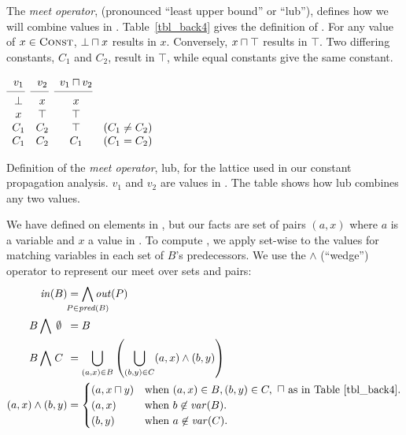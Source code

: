 \documentclass[12pt]{report}
\begin{document}
The \emph{meet operator}, \lub (pronounced ``least upper bound'' or
``lub''), defines how we will combine values in
\setLC. Table~\ref{tbl_back4} gives the definition of \lub. For any
value of $x \in \textsc{Const}$, $\bot \lub x$ results in $x$. Conversely, $x
\lub \top$ results in $\top$. Two differing constants, $C_1$ and
$C_2$, result in $\top$, while equal constants give the same constant. 

\begin{myfig}
  \begin{math}
    \begin{array}{cccc}
      v_1 & v_2 & v_1 \lub v_2 \\
      \cmidrule(r){1-1}\cmidrule(r){2-2}\cmidrule(r){3-3}
      \bot & x & x \\
      x & \top & \top & \\ 
      C_1 & C_2 & \top & \text{($C_1 \neq C_2$)} \\
      C_1 & C_2 & C_1 & \text{($C_1 = C_2$)}
    \end{array}
  \end{math}
  \caption{Definition of the \emph{meet operator}, lub, for the
    lattice used in our constant propagation analysis. $v_1$ and $v_2$
    are values in \setLC. The table shows how lub combines any two
    values.}
  \label{tbl_back4}
\end{myfig}

We have defined \lub on elements in \setLC, but our facts are set of
pairs $(a,x)$ where $a$ is a variable and $x$ a value in \setLC. To
compute \inBa, we apply \lub set-wise to the values for matching
variables in each \out set of $B$'s predecessors. We use the $\wedge$
(``wedge'') operator to represent our meet over sets and pairs:
\begin{align}\allowdisplaybreaks[0]
    \inBa &= \bigwedge\limits_{\mathclap{P \in \mathit{pred}(B)}} \outXa{P} \label{eqn_back8}\\ 
    B \bigwedge\ \,\mathclap{\emptyset}\phantom{C} &= B \notag\\*
    B \bigwedge\ \,\mathclap{C}\phantom{C} &= \bigcup\limits_{(a,x) \in B}
    \left(\bigcup\limits_{(b,y) \in C} (a,x) \wedge (b,y)\right) \label{eqn_back6}\\
  (a,x) \wedge (b,y) &= 
  \begin{cases}
    (a,x \lub y) & \text{when}\ (a,x) \in B, (b,y) \in C,\ \text{\lub as in Table~\ref{tbl_back4}.}\\
    (a,x) & \text{when}\ b \not\in \mathit{var}(B). \\
    (b,y) & \text{when}\ a \not\in \mathit{var}(C). \\
  \end{cases} \label{eqn_back7}
\end{align}
\end{document}
